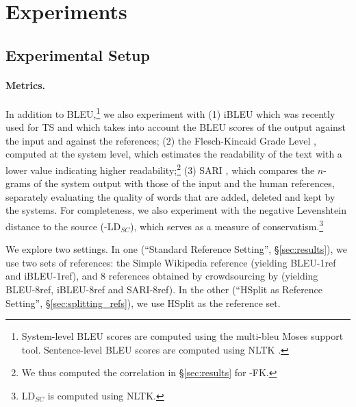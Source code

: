 \documentclass[11pt,a4paper]{article}
\begin{document}
\vspace{-1cm}
\section{Experiments}\label{sec:correlation}

\subsection{Experimental Setup}\label{sec:systems}

\paragraph{Metrics.} \label{sec:metrics}
In addition to BLEU,\footnote{System-level BLEU scores are computed using the multi-bleu Moses support tool. Sentence-level BLEU scores are computed using NLTK \citep{LB02}.} we also experiment with (1) iBLEU \citep{SZ12} which was recently used for TS \citep{Xu16,Z17} and
which takes into account the BLEU scores of the output against the input and against the references;
(2) the Flesch-Kincaid Grade Level \citep[FK;][]{K75}, computed at the system level, which estimates the readability of the text with a lower value
indicating higher readability;\footnote{We thus computed the correlation in \S\ref{sec:results} for -FK.}  %
(3) SARI \citep{Xu16}, which compares the $n$-grams of the system output with those of the input and the human references, separately evaluating the quality of words that are added, deleted and kept by the systems. 
For completeness, we also experiment with the negative Levenshtein distance to the source (-LD$_{SC}$), which serves as a measure of conservatism.\footnote{LD$_{SC}$ is computed using NLTK.}


We explore two settings. In one (``Standard Reference Setting'', \S\ref{sec:results}), we use two sets of references: the Simple Wikipedia reference (yielding BLEU-1ref and iBLEU-1ref), and 8 references obtained by crowdsourcing by \citet{Xu16} (yielding BLEU-8ref, iBLEU-8ref and SARI-8ref). In the other (``HSplit as Reference Setting'', \S\ref{sec:splitting_refs}), we use HSplit as the reference set.
\end{document}
